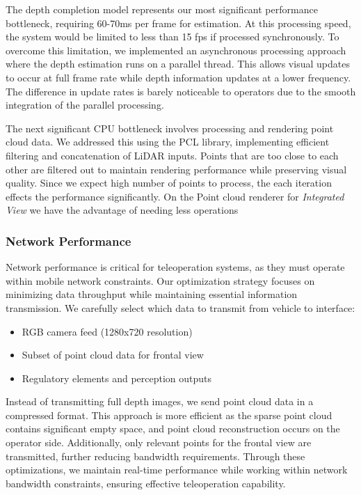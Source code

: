 The depth completion model represents our most significant performance bottleneck, requiring 60-70ms per frame for estimation. At this processing speed, the system would be limited to less than 15 fps if processed synchronously. To overcome this limitation, we implemented an asynchronous processing approach where the depth estimation runs on a parallel thread. This allows visual updates to occur at full frame rate while depth information updates at a lower frequency. The difference in update rates is barely noticeable to operators due to the smooth integration of the parallel processing.

The next significant CPU bottleneck involves processing and rendering point cloud data. We addressed this using the PCL library, implementing efficient filtering and concatenation of \ac{LiDAR} inputs. Points that are too close to each other are filtered out to maintain rendering performance while preserving visual quality.
Since we expect high number of points to process, the each iteration effects the performance significantly. On the Point cloud renderer for \emph{Integrated View} we have the advantage of needing less operations

\subsubsection{Network Performance}
Network performance is critical for teleoperation systems, as they must operate within mobile network constraints. Our optimization strategy focuses on minimizing data throughput while maintaining essential information transmission.
We carefully select which data to transmit from vehicle to interface:
\begin{itemize}
\item RGB camera feed (1280x720 resolution)
\item Subset of point cloud data for frontal view
\item Regulatory elements and perception outputs
\end{itemize}
Instead of transmitting full depth images, we send point cloud data in a compressed format. This approach is more efficient as the sparse point cloud contains significant empty space, and point cloud reconstruction occurs on the operator side. Additionally, only relevant points for the frontal view are transmitted, further reducing bandwidth requirements.
Through these optimizations, we maintain real-time performance while working within network bandwidth constraints, ensuring effective teleoperation capability.

\newpage
\thispagestyle{empty}
\mbox{}
\newpage
